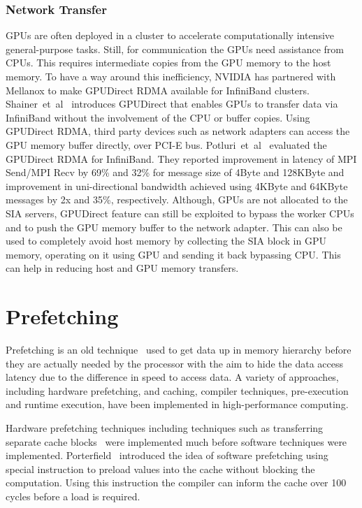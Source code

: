 \subsubsection{Network Transfer}
GPUs are often deployed in a cluster to accelerate computationally intensive
general-purpose tasks. Still, for communication the GPUs need assistance from CPUs.
This requires intermediate copies from the GPU memory to the host memory. To have
a way around this inefficiency, NVIDIA has partnered with Mellanox to make GPUDirect
RDMA available for InfiniBand clusters. Shainer~et~al~\cite{Shainer2011} introduces
GPUDirect that enables GPUs to transfer data via InfiniBand without the  involvement
of the CPU or buffer copies. Using GPUDirect RDMA, third party devices such as
network adapters can access the GPU memory buffer directly, over PCI-E bus.
Potluri~et~al~\cite{6687341} evaluated the GPUDirect RDMA for InfiniBand. They reported
improvement in latency of MPI Send/MPI Recv by 69\% and 32\% for message size of
4Byte and 128KByte and improvement in uni-directional bandwidth achieved using
4KByte and 64KByte messages by 2x and 35\%, respectively.
Although, GPUs are not allocated to the SIA servers, GPUDirect feature can still
be exploited to bypass the worker CPUs and to push the GPU memory buffer to the network
adapter. This can also be used to completely avoid host memory by collecting the
SIA block in GPU memory, operating on it using GPU and sending it back bypassing
CPU. This can help in reducing host and GPU memory transfers.

\section{Prefetching}
Prefetching is an old technique~\cite{anacker68}\cite{Smith1982}\cite{Vanderwiel2000}
used to get data up in memory hierarchy before they are actually needed by the processor
with the aim to hide the data access latency due to the difference in speed to access
data. A variety of approaches, including hardware prefetching, and caching, compiler
techniques, pre-execution and runtime execution, have been implemented in
high-performance computing.

Hardware prefetching techniques including techniques such as transferring separate
cache blocks~\cite{Smith1978} were implemented much before software techniques were
implemented. Porterfield~\cite{Porterfield1989} introduced the idea of software prefetching
using special instruction to preload values into the cache without blocking the
computation. Using this instruction the compiler can inform the cache over 100
cycles before a load is required.


